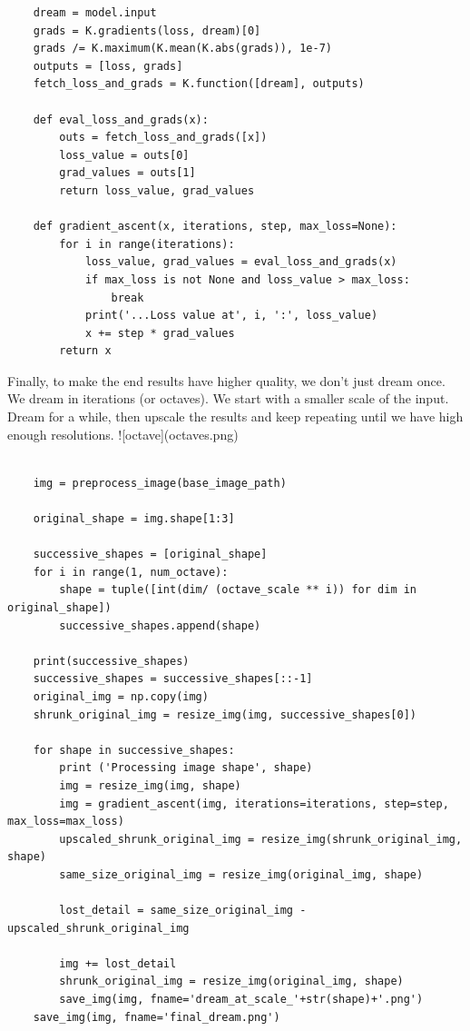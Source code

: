 \documentclass[graybox]{svmult}
\begin{document}
\begin{verbatim}
    dream = model.input
    grads = K.gradients(loss, dream)[0]
    grads /= K.maximum(K.mean(K.abs(grads)), 1e-7)
    outputs = [loss, grads]
    fetch_loss_and_grads = K.function([dream], outputs)
    
    def eval_loss_and_grads(x):
        outs = fetch_loss_and_grads([x])
        loss_value = outs[0]
        grad_values = outs[1]
        return loss_value, grad_values
    
    def gradient_ascent(x, iterations, step, max_loss=None):
        for i in range(iterations):
            loss_value, grad_values = eval_loss_and_grads(x)
            if max_loss is not None and loss_value > max_loss:
                break
            print('...Loss value at', i, ':', loss_value)
            x += step * grad_values
        return x
\end{verbatim}

Finally, to make the end results have higher quality, we don't just dream once. We dream in iterations (or octaves). We start with a smaller scale of the input. Dream for a while, then upscale the results and keep repeating until we have high enough resolutions.
![octave](octaves.png)

\begin{verbatim}
    
    img = preprocess_image(base_image_path)
    
    original_shape = img.shape[1:3]
    
    successive_shapes = [original_shape]
    for i in range(1, num_octave):
        shape = tuple([int(dim/ (octave_scale ** i)) for dim in original_shape])
        successive_shapes.append(shape)
    
    print(successive_shapes)
    successive_shapes = successive_shapes[::-1]
    original_img = np.copy(img)
    shrunk_original_img = resize_img(img, successive_shapes[0])
    
    for shape in successive_shapes:
        print ('Processing image shape', shape)
        img = resize_img(img, shape)
        img = gradient_ascent(img, iterations=iterations, step=step, max_loss=max_loss)
        upscaled_shrunk_original_img = resize_img(shrunk_original_img, shape)
        same_size_original_img = resize_img(original_img, shape)
    
        lost_detail = same_size_original_img - upscaled_shrunk_original_img
    
        img += lost_detail
        shrunk_original_img = resize_img(original_img, shape)
        save_img(img, fname='dream_at_scale_'+str(shape)+'.png')
    save_img(img, fname='final_dream.png')
\end{verbatim}
\end{document}
